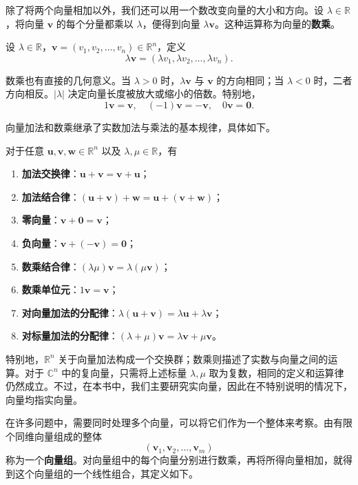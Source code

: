 除了将两个向量相加以外，我们还可以用一个数改变向量的大小和方向。设 \(\lambda\in\mathbb R\)，将向量 \(\bm v\) 的每个分量都乘以 \(\lambda\)，便得到向量 \(\lambda\bm v\)。这种运算称为向量的\textbf{数乘}。

\begin{definition}[向量的数乘]
    \label{def_scalar_mult}
    设 \(\lambda\in\mathbb R\)，\(\bm v=(v_1,v_2,\ldots,v_n)\in\mathbb R^n\)，定义
    \[
        \lambda\bm v
        =(\lambda v_1,\lambda v_2,\ldots,\lambda v_n).
    \]
\end{definition}

数乘也有直接的几何意义。当 \(\lambda>0\) 时，\(\lambda\bm v\) 与 \(\bm v\) 的方向相同；当 \(\lambda<0\) 时，二者方向相反。\(\lvert\lambda\rvert\) 决定向量长度被放大或缩小的倍数。特别地，
\[
    1\bm v=\bm v,\quad
    (-1)\bm v=-\bm v,\quad
    0\bm v=\bm 0.
\]

向量加法和数乘继承了实数加法与乘法的基本规律，具体如下。
\begin{property}[向量运算律]
    \label{prop_vector_ops}
    对于任意 \(\bm u,\bm v,\bm w\in\mathbb R^n\) 以及 \(\lambda,\mu\in\mathbb R\)，有
    \begin{enumerate}
        \item \textbf{加法交换律}：\(\bm u+\bm v=\bm v+\bm u\)；
        \item \textbf{加法结合律}：\((\bm u+\bm v)+\bm w=\bm u+(\bm v+\bm w)\)；
        \item \textbf{零向量}：\(\bm v+\bm 0=\bm v\)；
        \item \textbf{负向量}：\(\bm v+(-\bm v)=\bm 0\)；
        \item \textbf{数乘结合律}：\((\lambda\mu)\bm v=\lambda(\mu\bm v)\)；
        \item \textbf{数乘单位元}：\(1\bm v=\bm v\)；
        \item \textbf{对向量加法的分配律}：\(\lambda(\bm u+\bm v)=\lambda\bm u+\lambda\bm v\)；
        \item \textbf{对标量加法的分配律}：\((\lambda+\mu)\bm v=\lambda\bm v+\mu\bm v\)。
    \end{enumerate}
\end{property}

特别地，\(\mathbb R^n\) 关于向量加法构成一个交换群；数乘则描述了实数与向量之间的运算。对于 \(\mathbb C^n\) 中的复向量，只需将上述标量 \(\lambda,\mu\) 取为复数，相同的定义和运算律仍然成立。不过，在本书中，我们主要研究实向量，因此在不特别说明的情况下，向量均指实向量。

在许多问题中，需要同时处理多个向量，可以将它们作为一个整体来考察。由有限个同维向量组成的整体
\[
    (\bm v_1,\bm v_2,\ldots,\bm v_m)
\]
称为一个\textbf{向量组}。对向量组中的每个向量分别进行数乘，再将所得向量相加，就得到这个向量组的一个线性组合，其定义如下。


